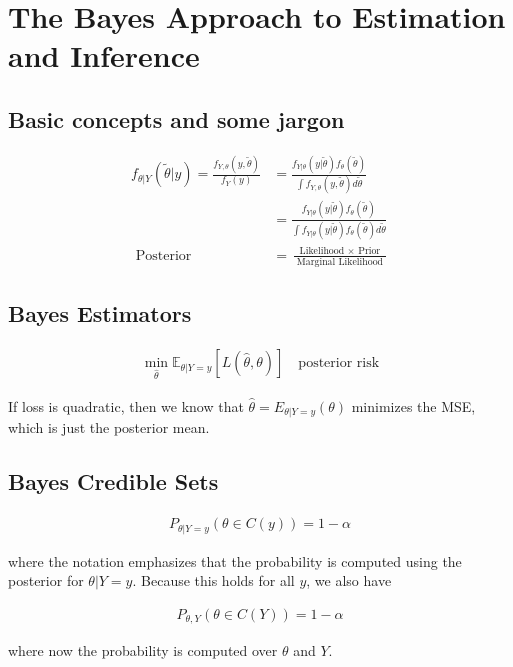 \section{The Bayes Approach to Estimation and Inference}

\subsection{Basic concepts and some jargon}

\begin{align*}
    f_{\theta | Y}(\tilde{\theta} | y)=\frac{f_{Y, \theta}(y, \tilde{\theta})}{f_Y(y)}&=\frac{f_{Y | \theta}(y | \tilde{\theta}) f_\theta(\tilde{\theta})}{\int f_{Y, \theta}(y, \tilde{\theta}) d \tilde{\theta}}\\
    &=\frac{f_{Y | \theta}(y | \tilde{\theta}) f_\theta(\tilde{\theta})}{\int f_{Y | \theta}(y | \tilde{\theta}) f_\theta(\tilde{\theta}) d \tilde{\theta}} \\
    \text { Posterior }&=\frac{\text { Likelihood } \times \text { Prior }}{\text { Marginal Likelihood }}
\end{align*}

\subsection{Bayes Estimators}

\begin{align*}
    \min _{\hat{\theta}} \mathbb{E} _{\theta | Y=y}[L(\hat{\theta}, \theta)] \quad\text{posterior risk}
\end{align*}

If loss is quadratic, then we know that $\hat{\theta}= E _{\theta | Y=y}(\theta)$ minimizes the MSE, which is just the posterior mean.

\subsection{Bayes Credible Sets}

\begin{align*}
    P _{\theta | Y=y}(\theta \in C(y))=1-\alpha
\end{align*}

where the notation emphasizes that the probability is computed using the posterior for $\theta|Y=y$. Because this holds for all $y$, we also have

\begin{align*}
    P _{\theta, Y}(\theta \in C(Y))=1-\alpha
\end{align*}

where now the probability is computed over $\theta$ and $Y$.